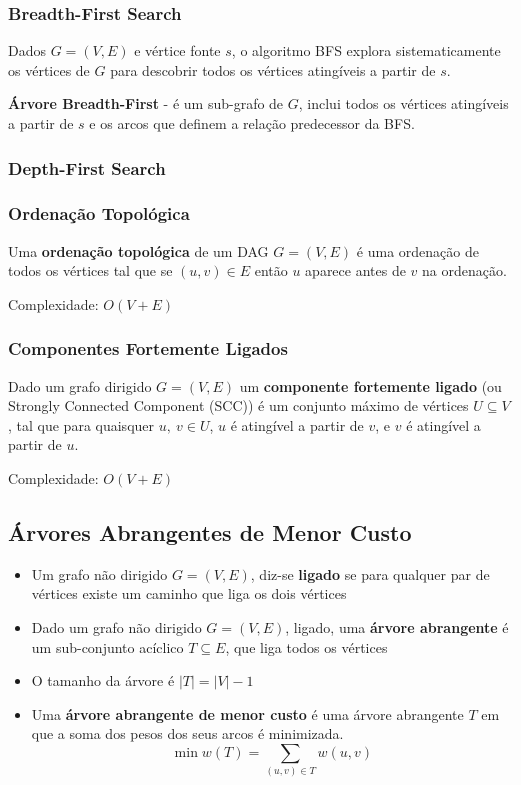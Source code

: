 \documentclass[11pt]{article}
\begin{document}
\subsubsection{Breadth-First Search}

Dados $G = (V,E)$ e vértice fonte $s$, o algoritmo BFS explora
sistematicamente os vértices de $G$ para descobrir todos os vértices
atingíveis a partir de $s$.

\textbf{Árvore Breadth-First} - é um sub-grafo de $G$, inclui todos os vértices atingíveis a partir de $s$ e os arcos que definem a relação predecessor da BFS.

\subsubsection{Depth-First Search}


\subsubsection{Ordenação Topológica}

Uma \textbf{ordenação topológica} de um DAG $G = (V,E)$ é uma ordenação de
todos os vértices tal que se $(u,v) \in E$ então $u$ aparece antes de $v$ na
ordenação.

Complexidade: $O(V+E)$

\subsubsection{Componentes Fortemente Ligados}

Dado um grafo dirigido $G = (V,E)$ um \textbf{componente fortemente ligado} (ou Strongly Connected Component (SCC)) é um conjunto máximo de vértices $U \subseteq V$, tal que para quaisquer $u,\ v \in U$, $u$ é atingível a partir de $v$, e $v$ é atingível a partir de $u$.

Complexidade: $O(V+E)$

\subsection{Árvores Abrangentes de Menor Custo} 

\begin{itemize}[topsep=0pt]
    \item Um grafo não dirigido $G = (V,E)$, diz-se \textbf{ligado} se para qualquer par de vértices existe um caminho que liga os dois vértices
    \item Dado um grafo não dirigido $G = (V,E)$, ligado, uma \textbf{árvore abrangente} é um sub-conjunto acíclico $T \subseteq E$, que liga todos os vértices
    \item O tamanho da árvore é $|T| = |V| - 1$
    \item Uma \textbf{árvore abrangente de menor custo} é uma árvore abrangente $T$ em que a soma dos pesos dos seus arcos é minimizada.
          \begin{equation*}
              \min w(T)=\sum_{(u,v)\in T} w(u,v)
          \end{equation*}
\end{itemize}
\end{document}
